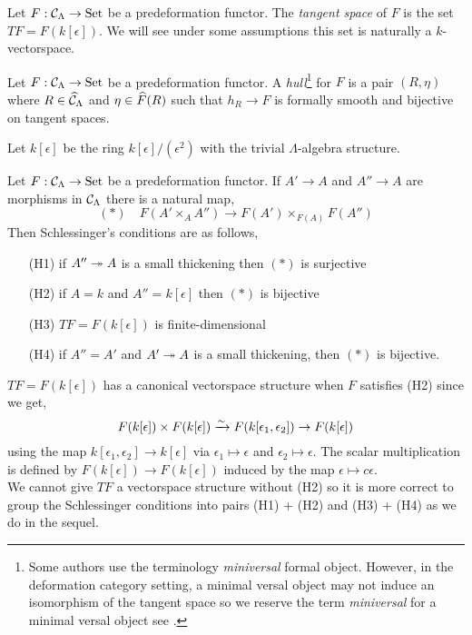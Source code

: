 \documentclass[12pt]{article}
\newcommand{\Set}{\mathrm{Set}}
\begin{document}
\begin{defn}
Let $F : \C_\Lambda \to \Set$ be a predeformation functor. The \textit{tangent space} of $F$ is the set $T F = F(k[\epsilon])$. We will see under some assumptions this set is naturally a $k$-vectorspace.
\end{defn}

\begin{defn}
Let $F : \C_\Lambda \to \Set$ be a predeformation functor. A \textit{hull}\footnote{Some authors use the terminology \textit{miniversal} formal object. However, in the deformation category setting, a minimal versal object may not induce an isomorphism of the tangent space so we reserve the term \textit{miniversal} for a minimal versal object see .} for $F$ is a pair $(R, \eta)$ where $R \in \widehat{\mathcal{C}}_{\Lambda}$ and $\eta \in \widehat{F}(R)$ such that $h_R \to F$ is formally smooth and bijective on tangent spaces.
\end{defn}

\begin{rmk}
Let $k[\epsilon]$ be the ring $k[\epsilon]/(\epsilon^2)$ with the trivial $\Lambda$-algebra structure. 
\end{rmk}

\begin{defn}
Let $F : \C_\Lambda \to \Set$ be a predeformation functor. If $A' \to A$ and $A'' \to A$ are morphisms in $\mathcal{C}_\Lambda$ there is a natural map,
\[ (*) \quad F(A' \times_A A'') \to F(A') \times_{F(A)} F(A'') \]
Then Schlessinger's conditions are as follows,
\begin{enumerate}
\item[(H1)] if $A'' \twoheadrightarrow A$ is a small thickening then $(*)$ is surjective
\item[(H2)] if $A = k$ and $A'' = k[\epsilon]$ then $(*)$ is bijective
\item[(H3)] $T F = F(k[\epsilon])$ is finite-dimensional
\item[(H4)] if $A'' = A'$ and $A' \twoheadrightarrow A$ is a small thickening, then $(*)$ is bijective.
\end{enumerate}
\end{defn}

\begin{rmk}
$T F = F(k[\epsilon])$ has a canonical vectorspace structure when $F$ satisfies (H2) since we get,
\[ F(k[\epsilon]) \times F(k[\epsilon]) \xrightarrow{\sim} F(k[\epsilon_1, \epsilon_2]) \to F(k[\epsilon]) \]
using the map $k[\epsilon_1, \epsilon_2] \to k[\epsilon]$ via $\epsilon_1 \mapsto \epsilon$ and $\epsilon_2 \mapsto \epsilon$. The scalar multiplication is defined by $F(k[\epsilon]) \to F(k[\epsilon])$ induced by the map $\epsilon \mapsto c \epsilon$. 
\bigskip\\
We cannot give $T F$ a vectorspace structure without (H2) so it is more correct to group the Schlessinger conditions into pairs (H1) + (H2) and (H3) + (H4) as we do in the sequel.
\end{rmk}
\end{document}

